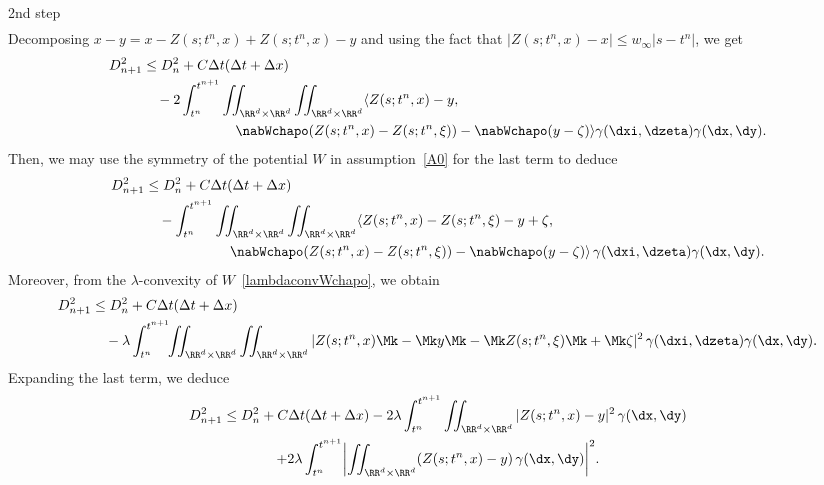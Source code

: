 \begin{step}{2nd step}
\begin{align*}
\end{align*}
Decomposing $x-y=x-Z(s;t^n,x)+Z(s;t^n,x)-y$ and using the fact that $|Z(s;t^n,x)-x|\leq w_\infty |s-t^n|$, we get
\begin{align*}
D_{n+1}^2 &\leq D_n^2 + C \Delta t(\Delta t+\Delta x) \\
&\quad - 2 \int_{t^n}^{t^{n+1}}\iint_{\RR^d\times \RR^d}\iint_{\RR^d\times \RR^d} \langle Z(s;t^n,x)-y, \\
&\mkern 120mu \nabWchapo(Z(s;t^n,x)-Z(s;t^n,\xi))-\nabWchapo(y-\zeta)\rangle \gamma(\dxi,\dzeta) \gamma(\dx,\dy).
\end{align*}
Then, we may use the symmetry of the potential $W$ in assumption~\eqref{A0} for the last term to deduce
\begin{align*}
D_{n+1}^2 & \leq D_n^2 + C \Delta t(\Delta t+\Delta x) \\
&\quad - \int_{t^n}^{t^{n+1}}\iint_{\RR^d\times \RR^d}\iint_{\RR^d\times \RR^d} \langle Z(s;t^n,x)-Z(s;t^n,\xi)-y+\zeta, \\
&\mkern 110mu \nabWchapo(Z(s;t^n,x)-Z(s;t^n,\xi))-\nabWchapo(y-\zeta)\rangle\, \gamma(\dxi,\dzeta) \gamma(\dx,\dy).
\end{align*}
Moreover, from the $\lambda$-convexity of $W$~\eqref{lambdaconvWchapo}, we obtain
\begin{align*}
D_{n+1}^2 &\leq D_n^2 + C \Delta t(\Delta t+\Delta x) \\
& \quad - \lambda \int_{t^n}^{t^{n+1}}\!\!\iint_{\RR^d\times \RR^d}\iint_{\RR^d\times \RR^d} |Z(s;t^n,x)\Mk-\Mk y\Mk-\Mk Z(s;t^n,\xi)\Mk+\Mk\zeta|^2\, \gamma(\dxi,\dzeta) \gamma(\dx,\dy).
\end{align*}
Expanding the last term, we deduce
\begin{multline}
D_{n+1}^2 \leq D_n^2 + C \Delta t(\Delta t+\Delta x) - 2\lambda \int_{t^n}^{t^{n+1}} \iint_{\RR^d\times \RR^d} |Z(s;t^n,x)-y|^2
\,\gamma(\dx,\dy) \\
+ 2\lambda \int_{t^n}^{t^{n+1}} \biggl\vert \iint_{\RR^d\times \RR^d} (Z(s;t^n,x)-y)
\,\gamma(\dx,\dy) \biggr\vert^2. \label{interm2}
\end{multline}
\end{step}

